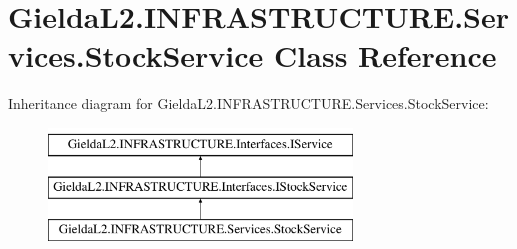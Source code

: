 \hypertarget{class_gielda_l2_1_1_i_n_f_r_a_s_t_r_u_c_t_u_r_e_1_1_services_1_1_stock_service}{}\section{Gielda\+L2.\+I\+N\+F\+R\+A\+S\+T\+R\+U\+C\+T\+U\+R\+E.\+Services.\+Stock\+Service Class Reference}
\label{class_gielda_l2_1_1_i_n_f_r_a_s_t_r_u_c_t_u_r_e_1_1_services_1_1_stock_service}
Inheritance diagram for Gielda\+L2.\+I\+N\+F\+R\+A\+S\+T\+R\+U\+C\+T\+U\+R\+E.\+Services.\+Stock\+Service\+:\begin{figure}[H]
\begin{center}
\leavevmode
\includegraphics[height=3.000000cm]{class_gielda_l2_1_1_i_n_f_r_a_s_t_r_u_c_t_u_r_e_1_1_services_1_1_stock_service}
\end{center}
\end{figure}
